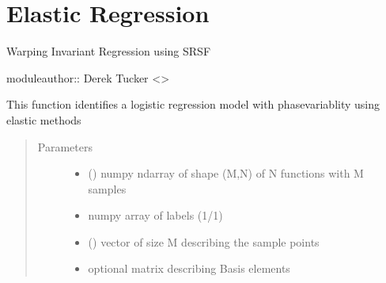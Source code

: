 \documentclass[letterpaper,10pt,english]{sphinxmanual}
\begin{document}
\chapter{Elastic Regression}
\label{\detokenize{regression:module-regression}}\label{\detokenize{regression:elastic-regression}}\label{\detokenize{regression::doc}}
Warping Invariant Regression using SRSF

moduleauthor:: Derek Tucker \textless{}\textgreater{}

\begin{fulllineitems}
\label{\detokenize{regression:regression.elastic_logistic}}
This function identifies a logistic regression model with
phase\sphinxhyphen{}variablity using elastic methods
\begin{quote}\begin{description}
\item[{Parameters}] \leavevmode\begin{itemize}
\item {} 
 () \textendash{} numpy ndarray of shape (M,N) of N functions with M samples

\item {} 
 \textendash{} numpy array of labels (1/\sphinxhyphen{}1)

\item {} 
 () \textendash{} vector of size M describing the sample points

\item {} 
 \textendash{} optional matrix describing Basis elements


\end{itemize}
\end{description}
\end{quote}
\end{fulllineitems}
\end{document}

